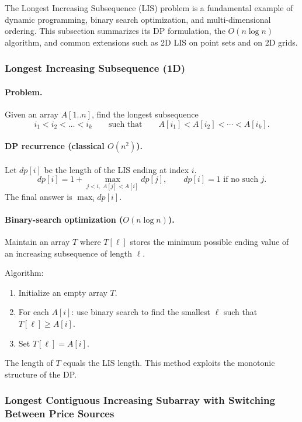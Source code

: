\documentclass[9pt]{extarticle}
\begin{document}
The Longest Increasing Subsequence (LIS) problem is a fundamental example of
dynamic programming, binary search optimization, and multi-dimensional ordering.
This subsection summarizes its DP formulation, the $O(n\log n)$ algorithm, and
common extensions such as 2D LIS on point sets and on 2D grids.

\subsubsection{Longest Increasing Subsequence (1D)}

\paragraph{Problem.}
Given an array $A[1..n]$, find the longest subsequence
\[
i_1 < i_2 < \dots < i_k
\qquad\text{such that}\qquad
A[i_1] < A[i_2] < \cdots < A[i_k].
\]

\paragraph{DP recurrence (classical $O(n^2)$).}
Let $dp[i]$ be the length of the LIS ending at index $i$.
\[
dp[i] = 1 + \max_{j<i,\;A[j]<A[i]} dp[j],
\qquad
dp[i] = 1 \text{ if no such } j.
\]
The final answer is $\max_i dp[i]$.

\paragraph{Binary-search optimization ($O(n\log n)$).}
Maintain an array $T$ where $T[\ell]$ stores the minimum possible ending value
of an increasing subsequence of length $\ell$.

Algorithm:
\begin{enumerate}
    \item Initialize an empty array $T$.
    \item For each $A[i]$:
          use binary search to find the smallest $\ell$ such that $T[\ell] \ge A[i]$.
    \item Set $T[\ell] = A[i]$.
\end{enumerate}
The length of $T$ equals the LIS length.
This method exploits the monotonic structure of the DP.
\subsubsection{Longest Contiguous Increasing Subarray with Switching Between Price Sources}
\end{document}
